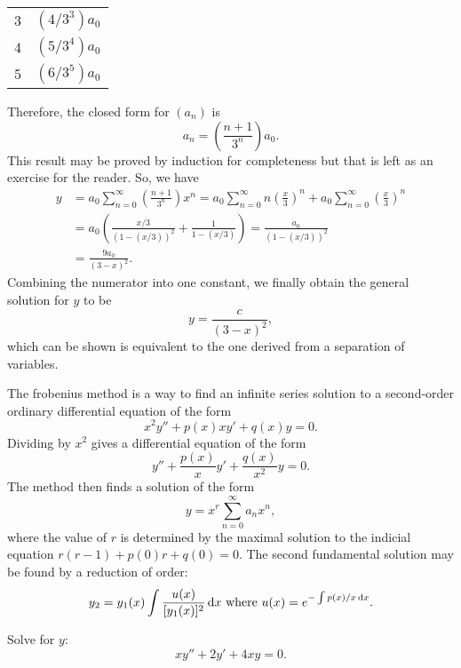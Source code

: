 \begin{soln}
\begin{center}
\begin{tabular}{| c | c |}
            $3$ & $(4/3^3)a_0$ \\
            $4$ & $(5/3^4)a_0$ \\
            $5$ & $(6/3^5)a_0$ \\
            \hline
        \end{tabular}
    \end{center}
    Therefore, the closed form for $(a_n)$ is $$a_n = \left(\frac{n+1}{3^n}\right)a_0.$$ 
    This result may be proved by induction for completeness but that is left
    as an exercise for the reader. So,
    we have 
    \begin{align*}
        y &= a_0\sum_{n = 0}^{\infty} \left(\frac{n+1}{3^n}\right) x^n
          = a_0 \sum_{n = 0}^{\infty} n \left(\frac{x}{3} \right)^n + a_0\sum_{n=0}^{\infty} \left(\frac{x}{3}\right)^n \\
        &= a_0 \left(\frac{x/3}{(1-(x/3))^2}+\frac{1}{1-(x/3)} \right)
        =\frac{a_0}{(1-(x/3))^2} \\
        &= \frac{9a_0}{(3-x)^2}.
    \end{align*}
    Combining the numerator into one constant, we finally obtain the general
    solution for $y$ to be $$y = \frac{c}{(3-x)^2},$$
    which can be shown is equivalent to the one derived from a separation
    of variables.
\end{soln}
\begin{theorem}
    The frobenius method is a way to find an infinite series solution
    to a second-order ordinary differential equation of the form
    $$x^2y'' + p(x)xy' + q(x)y = 0.$$ Dividing by $x^2$ gives a differential
    equation of the form 
    $$y''+\frac{p(x)}{x}y'+\frac{q(x)}{x^2}y = 0.$$
    The method then finds a solution of the form $$y=x^r\sum_{n=0}^{\infty}a_nx^n,$$
    where the value of $r$ is determined by the
    maximal solution to the \alert{indicial equation} $r(r-1)+p(0)r + q(0) = 0$.
    The second fundamental solution may be found by a reduction of order:
    $$y_2 = y_1(x)\int \frac{u(x)}{[y_1(x)]^2} \dif x ~ \text{where} ~ u(x) = e^{-\int p(x)/x \dif x}.$$
\end{theorem}
\begin{example}[Frobenius]
    Solve for $y$:
    $$xy''+2y'+4xy = 0.$$
\end{example}
